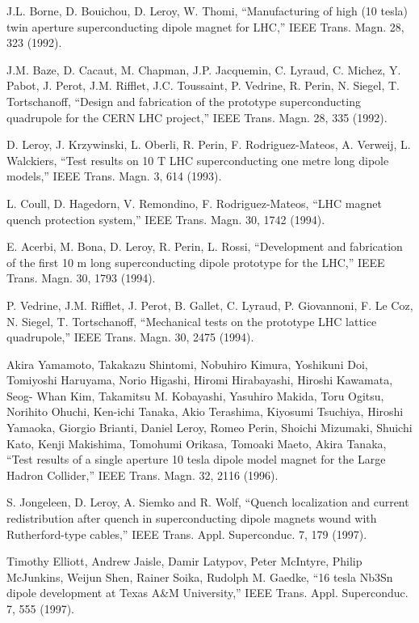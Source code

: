 \noindent [9.309] J.L. Borne, D. Bouichou, D. Leroy, W. Thomi, ``Manufacturing of high (10 tesla)
twin aperture superconducting dipole magnet for LHC,” IEEE Trans. Magn. 28,
323 (1992).

\noindent [9.310] J.M. Baze, D. Cacaut, M. Chapman, J.P. Jacquemin, C. Lyraud, C. Michez, Y.
Pabot, J. Perot, J.M. Rifflet, J.C. Toussaint, P. Vedrine, R. Perin, N. Siegel, T.
Tortschanoff, ``Design and fabrication of the prototype superconducting quadrupole
for the CERN LHC project,” IEEE Trans. Magn. 28, 335 (1992).

\noindent [9.311] D. Leroy, J. Krzywinski, L. Oberli, R. Perin, F. Rodriguez-Mateos, A. Verweij,
L. Walckiers, ``Test results on 10 T LHC superconducting one metre long dipole
models,” IEEE Trans. Magn. 3, 614 (1993).

\noindent [9.312] L. Coull, D. Hagedorn, V. Remondino, F. Rodriguez-Mateos, ``LHC magnet
quench protection system,” IEEE Trans. Magn. 30, 1742 (1994).

\noindent [9.313] E. Acerbi, M. Bona, D. Leroy, R. Perin, L. Rossi, ``Development and fabrication of
the first 10 m long superconducting dipole prototype for the LHC,” IEEE Trans.
Magn. 30, 1793 (1994).

\noindent [9.314] P. Vedrine, J.M. Rifflet, J. Perot, B. Gallet, C. Lyraud, P. Giovannoni, F. Le
Coz, N. Siegel, T. Tortschanoff, ``Mechanical tests on the prototype LHC lattice
quadrupole,” IEEE Trans. Magn. 30, 2475 (1994).

\noindent [9.315] Akira Yamamoto, Takakazu Shintomi, Nobuhiro Kimura, Yoshikuni Doi, Tomiyoshi
Haruyama, Norio Higashi, Hiromi Hirabayashi, Hiroshi Kawamata, Seog-
Whan Kim, Takamitsu M. Kobayashi, Yasuhiro Makida, Toru Ogitsu, Norihito
Ohuchi, Ken-ichi Tanaka, Akio Terashima, Kiyosumi Tsuchiya, Hiroshi Yamaoka,
Giorgio Brianti, Daniel Leroy, Romeo Perin, Shoichi Mizumaki, Shuichi Kato,
Kenji Makishima, Tomohumi Orikasa, Tomoaki Maeto, Akira Tanaka, ``Test results
of a single aperture 10 tesla dipole model magnet for the Large Hadron
Collider,” IEEE Trans. Magn. 32, 2116 (1996).

\noindent [9.316] S. Jongeleen, D. Leroy, A. Siemko and R. Wolf, ``Quench localization and current
redistribution after quench in superconducting dipole magnets wound with
Rutherford-type cables,” IEEE Trans. Appl. Superconduc. 7, 179 (1997).

\noindent [9.317] Timothy Elliott, Andrew Jaisle, Damir Latypov, Peter McIntyre, Philip McJunkins,
Weijun Shen, Rainer Soika, Rudolph M. Gaedke, ``16 tesla Nb3Sn dipole
development at Texas A\&M University,” IEEE Trans. Appl. Superconduc. 7, 555
(1997).

